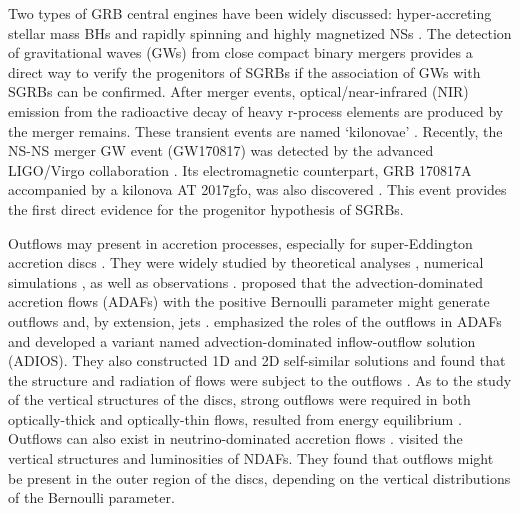 \documentclass[a4paper,fleqn,usenatbib]{mnras}
\begin{document}
Two types of GRB central engines have been widely discussed: hyper-accreting stellar mass BHs \citep[e.g.,][]{Woosley1993,Lei2009,Lei2013,Liu2017a} and rapidly spinning and highly magnetized NSs \citep[magnetars, see e.g.,][]{Usov1992,Thompson1994,Dai1998,Zhang2001,Dai2006}. The detection of gravitational waves (GWs) from close compact binary mergers \citep[e.g.,][]{Eichler1989,Schutz1989,Cutler1994,Lipunov1997,Abadie2010} provides a direct way to verify the progenitors of SGRBs if the association of GWs with SGRBs can be confirmed. After merger events, optical/near-infrared (NIR) emission from the radioactive decay of heavy r-process elements are produced by the merger remains. These transient events are named `kilonovae' \citep{Li1998}. Recently, the NS-NS merger GW event (GW170817) was detected by the advanced LIGO/Virgo collaboration \citep[e.g., ][]{Abbott2017a,Abbott2017b,Alexander2017,Blanchard2017,Coulter2017,Hallinan2017,Troja2017,Shappee2017}. Its electromagnetic counterpart, GRB 170817A accompanied by a kilonova AT 2017gfo, was also discovered \citep[e.g.,][]{Abbott2017c,Chornock2017,Cowperthwaite2017,Evans2017,Kilpatrick2017,Margutti2017,Nicholl2017,Smartt2017}. This event provides the first direct evidence for the progenitor hypothesis of SGRBs.

Outflows may present in accretion processes, especially for super-Eddington accretion discs \citep[e.g.,][]{Shakura1973}.
They were widely studied by theoretical analyses \citep[e.g.,][]{Blandford1999,Liu2008,Gu2015}, numerical simulations \citep[e.g.,][]{Eggum1988,Okuda2002,Ohsuga2005,Ohsuga2011,Jiang2014,Jiang2017,McKinney2014,Sadowski2014,Sadowski2015}, as well as observations \citep[e.g.,][]{Wang2013,Cheung2016,Parker2017a}. \citet{Narayan1994} proposed that the advection-dominated accretion flows (ADAFs) with the positive Bernoulli parameter might generate outflows and, by extension, jets \citep[e.g.,][]{Narayan1995,Abramowicz1995}. \citet{Blandford1999} emphasized the roles of the outflows in ADAFs and developed a variant named advection-dominated inflow-outflow solution (ADIOS). They also constructed 1D and 2D self-similar solutions and found that the structure and radiation of flows were subject to the outflows \citep{Blandford2004}. As to the study of the vertical structures of the discs, strong outflows were required in both optically-thick and optically-thin flows, resulted from energy equilibrium \citep[e.g.,][]{Gu2007,Gu2015}. Outflows can also exist in neutrino-dominated accretion flows \citep[NDAFs, see reviews by][]{Liu2017a}. \citet{Liu2012a} visited the vertical structures and luminosities of NDAFs. They found that outflows might be present in the outer region of the discs, depending on the vertical distributions of the Bernoulli parameter.
\end{document}
